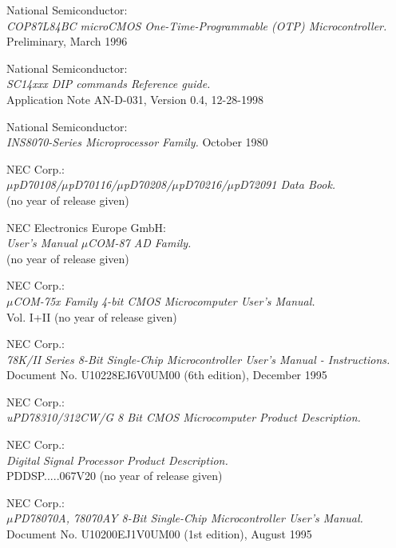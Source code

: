  National Semiconductor: \\
                   {\em COP87L84BC microCMOS One-Time-Programmable (OTP)
                    Microcontroller.\/} \\
                   Preliminary, March 1996

 National Semiconductor: \\
                   {\em SC14xxx DIP commands Reference guide.} \\
                   Application Note AN-D-031, Version 0.4, 12-28-1998

 National Semiconductor: \\ 
                  {\em INS8070-Series Microprocessor Family.\/} 
                  October 1980 

 NEC Corp.: \\
   	       {\em $\mu$pD70108/$\mu$pD70116/$\mu$pD70208/$\mu$pD70216/$\mu$pD72091 
               Data Book.\/} \\
               (no year of release given)

 NEC Electronics Europe GmbH: \\
                  {\em User's Manual $\mu$COM-87 AD Family.\/} \\
		  (no year of release given)

 NEC Corp.: \\
                {\em $\mu$COM-75x Family 4-bit CMOS Microcomputer User's
                 Manual.\/} \\
                Vol. I+II (no year of release given)

 NEC Corp.: \\
                {\em 78K/II Series 8-Bit Single-Chip Microcontroller
                 User's Manual - Instructions.\/} \\
                Document No. U10228EJ6V0UM00 (6th edition), December 1995

 NEC Corp.: \\
		{\em uPD78310/312CW/G 8 Bit CMOS Microcomputer Product
                 Description.\/}

 NEC Corp.: \\
                {\em Digital Signal Processor Product Description.\/} \\
                PDDSP.....067V20 (no year of release given)

 NEC Corp.: \\
                {\em $\mu$PD78070A, 78070AY 8-Bit Single-Chip Microcontroller
                 User's Manual.\/} \\
                Document No. U10200EJ1V0UM00 (1st edition), August 1995

